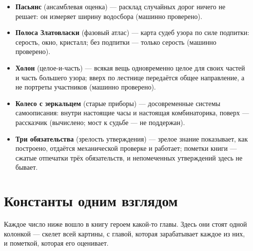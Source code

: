 \documentclass[11pt,letterpaper]{article}
\begin{document}
\begin{itemize}[leftmargin=1.4em, itemsep=1pt, parsep=0pt]
    рождается ровно с одной из семи красок целого --- краской
    кольца, по которому названо; паспорт целого хранится по краске
    на дитя, а вверх возвращается лишь уже почти согласное
    (машинно проверено).
  \item \textbf{Пасьянс} (ансамблевая оценка) --- расклад случайных
    дорог ничего не решает: он измеряет ширину водосбора (машинно
    проверено).
  \item \textbf{Полоса Златовласки} (фазовый атлас) --- карта судеб
    узора по силе подпитки: серость, окно, кристалл; без подпитки ---
    только серость (машинно проверено).
  \item \textbf{Холон} (целое-и-часть) --- всякая вещь одновременно
    целое для своих частей и часть большего узора; вверх по лестнице
    передаётся общее направление, а не портреты участников (машинно
    проверено).
  \item \textbf{Колесо с зеркальцем} (старые приборы) --- досовременные
    системы самоописания: внутри настоящие часы и настоящая
    комбинаторика, поверх --- рассказчик (вычислено; мост к судьбе ---
    не поддержан).
  \item \textbf{Три обязательства} (зрелость утверждения) ---
    зрелое знание показывает, как построено, отдаётся механической
    проверке и работает; пометки книги --- сжатые отпечатки трёх
    обязательств, и непомеченных утверждений здесь не бывает.
\end{itemize}

\section*{Константы одним взглядом}

Каждое число ниже вошло в книгу героем какой-то главы. Здесь они
стоят одной колонкой --- скелет всей картины, с главой, которая
зарабатывает каждое из них, и пометкой, которая его оценивает.
\end{document}
